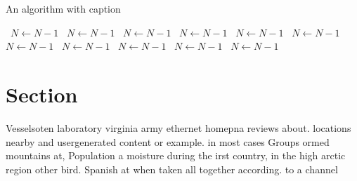 \documentclass[a4paper]{article}
\begin{document}
\begin{algorithm}
\caption{An algorithm with caption}
\begin{algorithmic}
\    \State $N \gets N - 1$
\    \State $N \gets N - 1$
\    \State $N \gets N - 1$
\    \State $N \gets N - 1$
\    \State $N \gets N - 1$
\    \State $N \gets N - 1$
\    \State $N \gets N - 1$
\    \State $N \gets N - 1$
\    \State $N \gets N - 1$
\    \State $N \gets N - 1$
\    \State $N \gets N - 1$
\EndWhile
\end{algorithmic}
\end{algorithm}

\section{Section}

Vesselsoten laboratory virginia army ethernet homepna reviews about. locations nearby and usergenerated content or example. in most cases Groups ormed mountains at, Population a moisture during the irst country, in the high arctic region other bird. Spanish at when taken all together according. to a channel 
\end{document}
